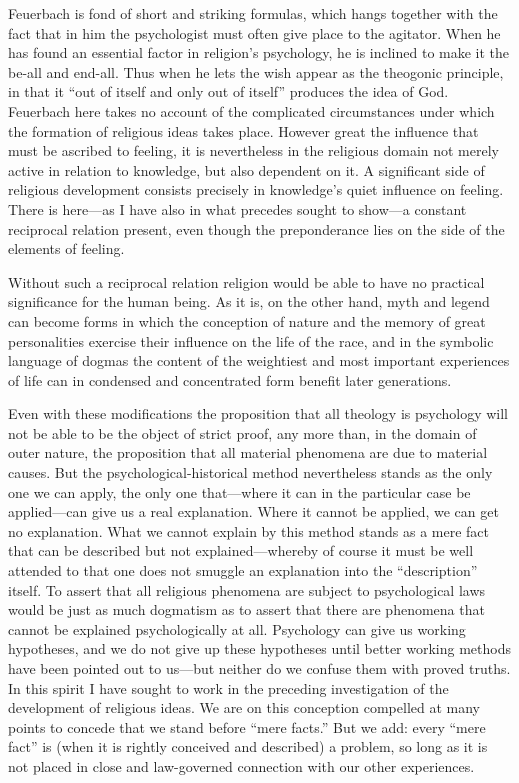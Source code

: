 \documentclass[12pt,a4paper]{book}
\newcommand{\opage}[1]{\marginnote{\footnotesize\textit{[#1]}}}
\begin{document}
Feuerbach is fond of short and striking formulas, which hangs together with the fact that in him
the psychologist must often give place to the agitator. When he has found an essential factor in
religion's psychology, he is inclined to make it the be-all and end-all. Thus when he lets the wish
appear as the theogonic principle, in that it ``out of itself and only out of itself'' produces the
idea of God. Feuerbach here takes no account of the complicated circumstances under which the
formation of religious ideas takes place. However great the influence that must be ascribed to
feeling, it is nevertheless in the religious domain not merely active in relation to knowledge, but
also dependent on it. A significant side of religious development consists precisely in knowledge's
quiet influence on feeling. There is here---as I have also in what precedes sought to show---a
constant reciprocal relation present, even though the preponderance lies on the side of the
elements of feeling.

Without such a reciprocal relation religion would be able to have no practical significance for the
human being. As it is, on the other hand, myth and legend can become forms in which the conception
of nature and the memory of great personalities exercise their influence on the life of the race,
and in the symbolic language of dogmas the content of the weightiest and most important experiences
of life can in condensed and concentrated form benefit later generations.

\opage{130}Even with these modifications the proposition that all theology is psychology will not be able to
be the object of strict proof, any more than, in the domain of outer nature, the proposition that
all material phenomena are due to material causes. But the psychological-historical method
nevertheless stands as the only one we can apply, the only one that---where it can in the
particular case be applied---can give us a real explanation. Where it cannot be applied, we can get
no explanation. What we cannot explain by this method stands as a mere fact that can be described
but not explained---whereby of course it must be well attended to that one does not smuggle an
explanation into the ``description'' itself. To assert that all religious phenomena are subject to
psychological laws would be just as much dogmatism as to assert that there are phenomena that
cannot be explained psychologically at all. Psychology can give us working hypotheses, and we do
not give up these hypotheses until better working methods have been pointed out to us---but neither
do we confuse them with proved truths. In this spirit I have sought to work in the preceding
investigation of the development of religious ideas. We are on this conception compelled at many
points to concede that we stand before ``mere facts.'' But we add: every ``mere fact'' is (when it
is rightly conceived and described) a problem, so long as it is not placed in close and law-governed
connection with our other experiences.
\end{document}
